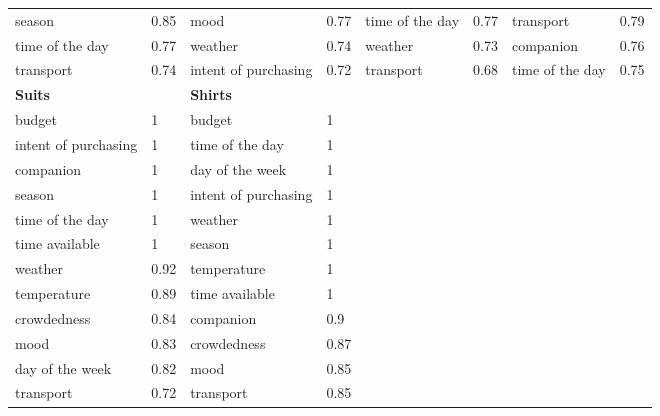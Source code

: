 \begin{center}
\begin{longtable}{p{2.2cm}p{0.5cm}p{2.2cm}p{0.5cm}p{2.2cm}p{0.5cm}p{2.3cm}p{0.5cm}}
season & 0.85 & mood & 0.77 & time of the day & 0.77 & transport & 0.79 \\
time of the day & 0.77 & weather & 0.74 & weather & 0.73 & companion & 0.76 \\
transport & 0.74 & intent of purchasing & 0.72 & transport & 0.68 & time of the day & 0.75 \\
\hline
\textbf{Suits} &  & \textbf{Shirts} \\
\hline
budget & 1 & budget & 1 \\
intent of purchasing & 1 & time of the day & 1 \\
companion & 1 & day of the week & 1 \\
season & 1 & intent of purchasing & 1 \\
time of the day & 1 & weather & 1 \\
time available & 1 & season & 1 \\
weather & 0.92 & temperature & 1 \\
temperature & 0.89 & time available & 1 \\
crowdedness & 0.84 & companion & 0.9 \\
mood & 0.83 & crowdedness & 0.87 \\
day of the week & 0.82 & mood & 0.85 \\
transport & 0.72 & transport & 0.85 \\
\end{longtable}
\end{center}